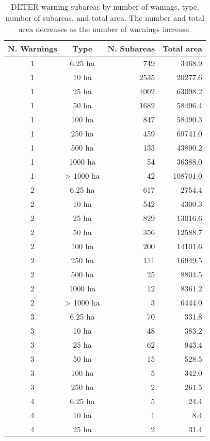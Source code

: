 \begin{table}[h] %
    \centering
    \begin{tabular}{|c|c|r|r|}
        \hline
        \textbf{N. Warnings} & \textbf{Type} & 
        \textbf{N. Subareas} & \textbf{Total area}  \\
        \hline
1 & 6.25 ha    &  749  &   3468.9 \\ 
1 & 10 ha      & 2535  &  20277.6 \\
1 & 25 ha      & 4002  &  63098.2 \\
1 & 50 ha      & 1682  &  58496.4 \\
1 & 100 ha     &  847  &  58490.3 \\
1 & 250 ha     &  459  &  69741.0 \\
1 & 500 ha     &  133  &  43890.2 \\
1 & 1000 ha    &   54  &  36388.0 \\
1 & > 1000 ha &   42  & 108701.0  \\
        \hline
2 & 6.25 ha    &  617  &   2754.4 \\
2 & 10 ha      &  542  &   4300.3 \\
2 & 25 ha      &  829  &  13016.6 \\
2 & 50 ha      &  356  &  12588.7 \\
2 & 100 ha     &  200  &  14101.6 \\
2 & 250 ha     &  111  &  16949.5 \\
2 & 500 ha     &   25  &   8804.5 \\
2 & 1000 ha    &   12  &   8361.2 \\
2 & > 1000 ha &    3  &   6444.0  \\
        \hline
3 & 6.25 ha    &   70  &    331.8 \\
3 & 10 ha      &   48  &    383.2 \\
3 & 25 ha      &   62  &    943.4 \\
3 & 50 ha      &   15  &    528.5 \\
3 & 100 ha     &    5  &    342.0 \\
3 & 250 ha     &    2  &    261.5 \\
        \hline
4 & 6.25 ha    &    5  &     24.4 \\
4 & 10 ha      &    1  &      8.4 \\
4 & 25 ha      &    2  &     31.4 \\
        \hline
    \end{tabular}
    \caption{DETER warning subareas by number of wanings, type, number of 
    subareas, and total area. The number and total area decreases as the number
    of warnings increase.}
    \label{tab:warnings_subareas_by_number_area}
\end{table}
